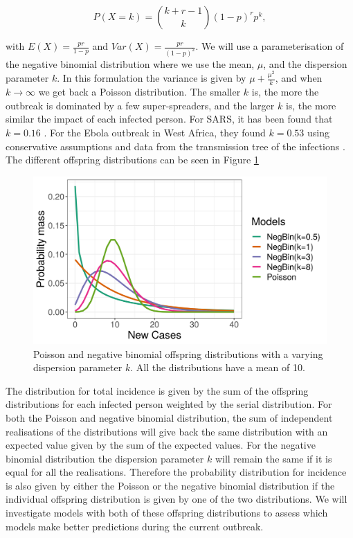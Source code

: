 \documentclass[12pt]{article}
\begin{document}
\[P(X=k) = {k + r - 1 \choose k} (1-p)^rp^k, \]

with $E(X)=\frac{pr}{1-p}$ and $Var(X) = \frac{pr}{(1-p)^2}$. We will use a parameterisation of the negative binomial distribution where we use the mean, $\mu$, and the dispersion parameter $k$. In this formulation the variance is given by $\mu + \frac{\mu^2}{k}$, and when $k \rightarrow \infty$ we get back a Poisson distribution. The smaller $k$ is, the more the outbreak is dominated by a few super-spreaders, and the larger $k$ is, the more similar the impact of each infected person. For SARS, it has been found that $k=0.16$ \cite{lloyd-smithSuperspreadingEffectIndividual2005}. For the Ebola outbreak in West Africa, they found $k=0.53$ using conservative assumptions and data from the transmission tree of the infections \cite{internationalebolaresponseteamExposurePatternsDriving2016}. The different offspring distributions can be seen in Figure \ref{fig:offspring}

\begin{figure}[h]
  \centering
  \includegraphics[width=\textwidth]{../output/prob_dist.png}
  \caption{Poisson and negative binomial offspring distributions with a varying dispersion parameter $k$. All the distributions have a mean of 10.}
  \label{fig:offspring}
\end{figure}

The distribution for total incidence is given by the sum of the offspring distributions for each infected person weighted by the serial distribution. For both the Poisson and negative binomial distribution, the sum of independent realisations of the distributions will give back the same distribution with an expected value given by the sum of the expected values. For the negative binomial distribution the dispersion parameter $k$ will remain the same if it is equal for all the realisations. Therefore the probability distribution for incidence is also given by either the Poisson or the negative binomial distribution if the individual offspring distribution is given by one of the two distributions. We will investigate models with both of these offspring distributions to assess which models make better predictions during the current outbreak.
\end{document}
